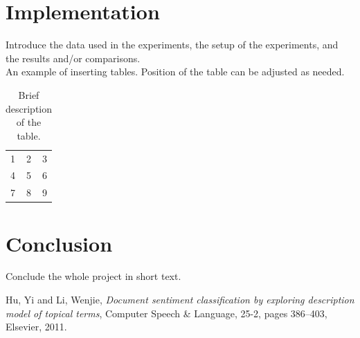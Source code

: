 \documentclass[11pt]{article}
\begin{document}
\section{Implementation}

Introduce the data used in the experiments, the setup of the experiments, and the results and/or comparisons. \\

An example of inserting tables. Position of the table can be adjusted as needed.
\begin{table}[!htp] 
  \centering
    \begin{tabular}{| l c r |}   %
    \hline
    1 & 2 & 3 \\
    4 & 5 & 6 \\ \hline
    7 & 8 & 9 \\
    \hline
    \end{tabular}
  \caption{Brief description of the table.}
\end{table}

\section{Conclusion}
Conclude the whole project in short text.


\begin{thebibliography}{9}

  Hu, Yi and Li, Wenjie,
  \textit{Document sentiment classification by exploring description model of topical terms},
  Computer Speech \& Language,
  25-2, pages 386--403,
  Elsevier, 2011.

\end{thebibliography}
 
\end{document}

